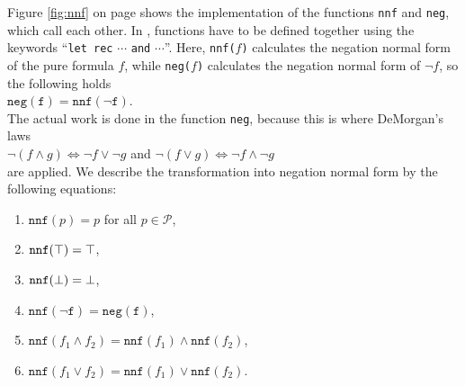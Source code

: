 Figure
\ref{fig:nnf} on page \pageref{fig:nnf} shows the implementation of the functions
\texttt{nnf} and \texttt{neg},
which call each other.  In \Fsharp,  functions have to be defined together
using the keywords ``\texttt{let rec} $\cdots$ \texttt{and} $\cdots$''.  Here, \texttt{nnf($f$)} calculates the
negation normal form of the pure formula $f$, while
\texttt{neg($f$)} calculates the negation normal form of $\neg f$, so the following holds
\\[0.2cm]
\hspace*{1.3cm}
$\texttt{neg}(\texttt{f}) = \texttt{nnf}(\neg \texttt{f})$.
\\[0.2cm]
 The actual work is done in the
function \texttt{neg}, because this is where DeMorgan's laws 
\\[0.2cm]
\hspace*{1.3cm}
$\neg (f \wedge g) \Leftrightarrow \neg f \vee \neg g$ \quad and \quad 
$\neg (f \vee g) \Leftrightarrow \neg f \wedge \neg g$ 
\\[0.2cm]
are applied.  We describe the transformation into negation normal form by 
the following equations: 
\begin{enumerate}
\item $\texttt{nnf}(p) = p$ \quad for all $p \in \mathcal{P}$,
\item $\texttt{nnf}(\top) = \top$,
\item $\texttt{nnf}(\bot) = \bot$,
\item $\texttt{nnf}(\neg \texttt{f}) = \texttt{neg}(\texttt{f})$,
\item $\texttt{nnf}(f_1 \wedge f_2) = \texttt{nnf}(f_1) \wedge \texttt{nnf}(f_2)$,
\item $\texttt{nnf}(f_1 \vee f_2) = \texttt{nnf}(f_1) \vee \texttt{nnf}(f_2)$.
\end{enumerate}

